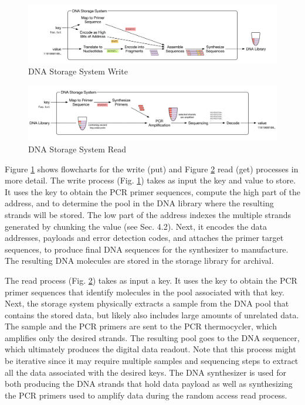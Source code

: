 \begin{figure}[h!]
    \centering
      \includegraphics[width=1.1\textwidth]{images/write}
      \caption{DNA Storage System Write}
      \label{fig:write}
  \end{figure}
  \begin{figure}[h!]
    \centering
      \includegraphics[width=1.1\textwidth]{images/read}
      \caption{DNA Storage System Read}
      \label{fig:read}
  \end{figure}

 Figure \ref{fig:write} shows flowcharts for the write (put) and Figure \ref{fig:read} read (get) processes in more detail. The write process (Fig. \ref{fig:write}) takes as input the key and value to store. It uses the key to obtain the PCR primer sequences, compute the high part of the address, and to determine the pool in the DNA library where the resulting strands will be stored. The low part of the address indexes the multiple strands generated by chunking the value (see Sec. 4.2). Next, it encodes the data addresses, payloads and error detection codes, and attaches the primer target sequences, to produce final DNA sequences for the synthesizer to manufacture. The resulting DNA molecules are stored in the storage library for archival.

 The read process (Fig. \ref{fig:read}) takes as input a key. It uses the key to obtain the PCR primer sequences that identify molecules in the pool associated with that key. Next, the storage system physically extracts a sample from the DNA pool that contains the stored data, but likely also includes large amounts of unrelated data. The sample and the PCR primers are sent to the PCR thermocycler, which amplifies only the desired strands. The resulting pool goes to the DNA sequencer, which ultimately produces the digital data readout. Note that this process might be iterative since it may require multiple samples and sequencing steps to extract all the data associated with the desired keys. The DNA synthesizer is used for both producing the DNA strands that hold data payload as well as synthesizing the PCR primers used to amplify data during the random access read process.

